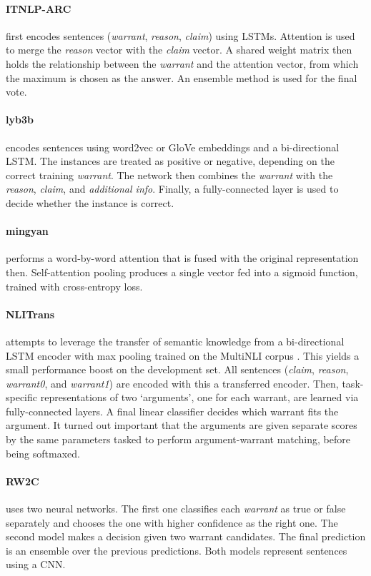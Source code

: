 \paragraph{ITNLP-ARC}
first encodes sentences (\emph{warrant}, \emph{reason}, \emph{claim}) using LSTMs. Attention is used to merge the \emph{reason} vector with the \emph{claim} vector. A shared weight matrix then holds the relationship between the \emph{warrant} and the attention vector, from which the maximum is chosen as the answer. An ensemble method is used for the final vote.


\paragraph{lyb3b}
encodes sentences using word2vec or GloVe embeddings and a bi-directional LSTM. The instances are treated as positive or negative, depending on the correct training \emph{warrant}. The network then combines the \emph{warrant} with the \emph{reason}, \emph{claim}, and \emph{additional info}. Finally, a fully-connected layer is used to decide whether the instance is correct.


\paragraph{mingyan}
performs a word-by-word attention that is fused with the original representation then. Self-attention pooling produces a single vector fed into a sigmoid function, trained with cross-entropy loss.


\paragraph{NLITrans}
attempts to leverage the transfer of semantic knowledge from a bi-directional LSTM encoder with max pooling trained on the MultiNLI corpus \cite{nangia-EtAl:2017:RepEval}. This yields a small performance boost on the development set. All sentences (\emph{claim}, \emph{reason}, \emph{warrant0}, and \emph{warrant1}) are encoded with this a transferred encoder. Then, task-specific representations of two `arguments', one for each warrant, are learned via fully-connected layers. A final linear classifier decides which warrant fits the argument. It turned out important that the arguments are given separate scores by the same parameters tasked to perform argument-warrant matching, before being softmaxed.


\paragraph{RW2C}
uses two neural networks. The first one classifies each \emph{warrant} as true or false separately and chooses the one with higher confidence as the right one. The second model makes a decision given two warrant candidates. The final prediction is an ensemble over the previous predictions. Both models represent sentences using a CNN.


